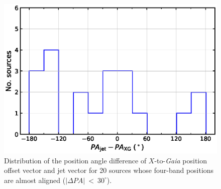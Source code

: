 \documentclass{aa}
\begin{document}
    \begin{figure}[hbtp]
        \centering
        \includegraphics[width=\columnwidth]{figs/jet-pa-com}
        \caption[]{\label{fig:jet-pa-com}
            Distribution of the position angle difference of $X$-to-\textit{Gaia} position offset vector and jet vector for 20 sources whose four-band positions are almost aligned ($|\Delta PA|~<~30^{\circ}$).
        }
    \end{figure}

\end{document}
